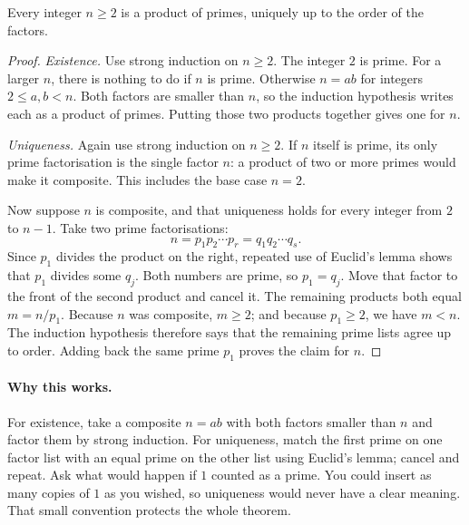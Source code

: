 \begin{theorem}\label{thm:fta}
Every integer $n\ge2$ is a product of primes, uniquely up to the order of the factors.
\end{theorem}
\begin{proof}
\emph{Existence.} Use strong induction on $n\ge2$.
The integer $2$ is prime. For a larger $n$, there is nothing
to do if $n$ is prime. Otherwise $n=ab$ for integers
$2\le a,b<n$. Both factors are smaller than $n$, so the
induction hypothesis writes each as a product of primes.
Putting those two products together gives one for $n$.

\emph{Uniqueness.} Again use strong induction on $n\ge2$.
If $n$ itself is prime, its only prime factorisation is the
single factor $n$: a product of two or more primes would
make it composite. This includes the base case $n=2$.

Now suppose $n$ is composite, and that uniqueness holds
for every integer from $2$ to $n-1$. Take two prime
factorisations:
\[
n=p_1p_2\cdots p_r=q_1q_2\cdots q_s.
\]
Since $p_1$ divides the product on the right, repeated use
of Euclid's lemma shows that $p_1$ divides some $q_j$.
Both numbers are prime, so $p_1=q_j$. Move that factor to
the front of the second product and cancel it. The remaining
products both equal $m=n/p_1$. Because $n$ was composite,
$m\ge2$; and because $p_1\ge2$, we have $m<n$.
The induction hypothesis therefore says that the remaining
prime lists agree up to order. Adding back the same prime
$p_1$ proves the claim for $n$.
\end{proof}

\paragraph{Why this works.}
For existence, take a composite $n=ab$ with both factors smaller than $n$ and factor them by strong induction. For uniqueness, match the first prime on one factor list with an equal prime on the other list using Euclid's lemma; cancel and repeat. Ask what would happen if $1$ counted as a prime. You could insert as many copies of $1$ as you wished, so uniqueness would never have a clear meaning. That small convention protects the whole theorem.

